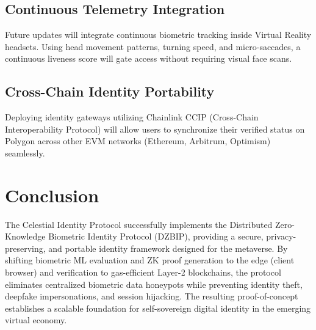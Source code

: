 \documentclass[12pt,a4paper,oneside]{report}
\begin{document}
\section{Continuous Telemetry Integration}
Future updates will integrate continuous biometric tracking inside Virtual Reality headsets. Using head movement patterns, turning speed, and micro-saccades, a continuous liveness score will gate access without requiring visual face scans.

\section{Cross-Chain Identity Portability}
Deploying identity gateways utilizing Chainlink CCIP (Cross-Chain Interoperability Protocol) will allow users to synchronize their verified status on Polygon across other EVM networks (Ethereum, Arbitrum, Optimism) seamlessly.

\newpage

\chapter{Conclusion}
The Celestial Identity Protocol successfully implements the Distributed Zero-Knowledge Biometric Identity Protocol (DZBIP), providing a secure, privacy-preserving, and portable identity framework designed for the metaverse. By shifting biometric ML evaluation and ZK proof generation to the edge (client browser) and verification to gas-efficient Layer-2 blockchains, the protocol eliminates centralized biometric data honeypots while preventing identity theft, deepfake impersonations, and session hijacking. The resulting proof-of-concept establishes a scalable foundation for self-sovereign digital identity in the emerging virtual economy.

\newpage
\end{document}
